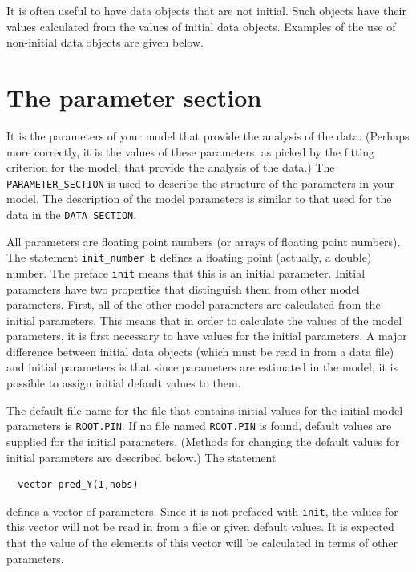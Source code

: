 \documentclass{admbmanual}
\newcommand\DS{\texttt{DATA\_SECTION}}
\begin{document}
It is often useful to have data objects that are not initial.
Such objects have their values calculated from the values of
initial data objects. Examples of the use of non-initial data objects
are given below.


\section{The parameter section}

It is the parameters of your model that
provide the analysis of the data.  (Perhaps more correctly, it
is the values of these parameters, as picked by the
fitting criterion for the model, that provide the
analysis of the data.)
The \texttt{PARAMETER\_SECTION} is used to describe the structure of the  
parameters in your model.
The description of the model parameters is similar to that used for
the data in the \DS.

All parameters are floating point numbers (or arrays of floating point numbers).
The statement \texttt{init\_number b} defines
a floating point (actually, a double) number. The preface \texttt{init}
means that this is an initial parameter. Initial parameters have
two properties that distinguish them from other model
parameters. First, all of the other model parameters are calculated from
the initial parameters. This means that in order to calculate the
values of the model parameters, it is first necessary to have 
values for the initial parameters. A major difference between
initial data objects (which must be read in from a data file) 
and initial parameters is that since parameters are estimated 
in the model, it is possible to assign initial default values to them.

The default file name for the file that contains initial
values for the initial model parameters is
\texttt{ROOT.PIN}. If no file named \texttt{ROOT.PIN} is found,
default values are supplied for the initial parameters.
(Methods for changing the default values for initial parameters
are described below.)
The statement
\begin{lstlisting}
  vector pred_Y(1,nobs)
\end{lstlisting}
defines
a vector of parameters. Since it is not prefaced with \texttt{init},
the values for this vector will not be read in from a file
or given default values. It is expected that the value of the
elements of this vector will be calculated in terms of
other parameters.
\end{document}
